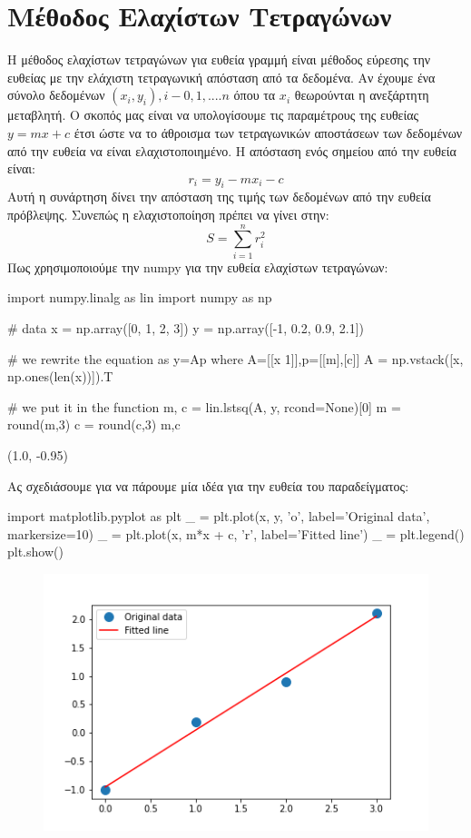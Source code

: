 \chapter{Μέθοδος Ελαχίστων Τετραγώνων}
Η μέθοδος ελαχίστων τετραγώνων για ευθεία γραμμή είναι μέθοδος εύρεσης την ευθείας με την ελάχιστη τετραγωνική απόσταση από τα δεδομένα. Αν έχουμε ένα σύνολο δεδομένων $(x_i,y_i),i-0,1,....n$
όπου τα $x_i$ θεωρούνται η ανεξάρτητη μεταβλητή. Ο σκοπός μας είναι να υπολογίσουμε τις παραμέτρους της ευθείας $y = m x+c$ έτσι ώστε να το άθροισμα των τετραγωνικών αποστάσεων των δεδομένων από την ευθεία να είναι ελαχιστοποιημένο. Η απόσταση ενός σημείου από την ευθεία είναι:
\begin{equation}
r_i = y_i-mx_i-c
\end{equation}
Αυτή η συνάρτηση δίνει την απόσταση της τιμής των δεδομένων από την ευθεία πρόβλεψης. Συνεπώς η ελαχιστοποίηση πρέπει να γίνει στην:
\begin{equation}
S=\sum_{i=1}^n r_i^2
\end{equation}
Πως χρησιμοποιούμε την {\en numpy} για την ευθεία ελαχίστων τετραγώνων:
\en
\begin{python}
import numpy.linalg as lin
import numpy as np

# data
x = np.array([0, 1, 2, 3])
y = np.array([-1, 0.2, 0.9, 2.1])

# we rewrite the equation as y=Ap where A=[[x 1]],p=[[m],[c]]
A = np.vstack([x, np.ones(len(x))]).T

# we put it in the function
m, c = lin.lstsq(A, y, rcond=None)[0]
m = round(m,3)
c = round(c,3)
m,c
\end{python}
\vspace*{-0.7cm}
\begin{codeout}
(1.0, -0.95)
\end{codeout}
\gr
Ας σχεδιάσουμε για να πάρουμε μία ιδέα για την ευθεία του παραδείγματος:
\en
\begin{python}
import matplotlib.pyplot as plt
_ = plt.plot(x, y, 'o', label='Original data', markersize=10)
_ = plt.plot(x, m*x + c, 'r', label='Fitted line')
_ = plt.legend()
plt.show()
\end{python}

\begin{center}
\begin{figure}[H]
\includegraphics[scale=1]{figures/lsplot.png}
\end{figure}
\end{center}